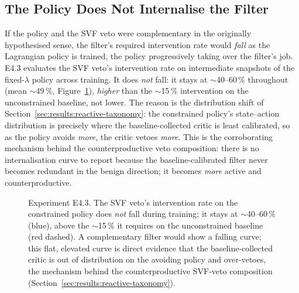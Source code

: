 \documentclass[11pt,a4paper]{report}
\begin{document}
\subsection{The Policy Does Not Internalise the Filter}
\label{sec:results:interaction}

If the policy and the SVF veto were complementary in the originally
hypothesised sense, the filter's required intervention rate would
\emph{fall} as the Lagrangian policy is trained, the policy
progressively taking over the filter's job. E4.3 evaluates the SVF
veto's intervention rate on intermediate snapshots of the
fixed-$\lambda$ policy across training. It does \emph{not} fall: it
stays at $\sim$40--60\,\% throughout (mean $\sim$49\,\%, Figure~\ref{fig:e4.3-internalisation}),
\emph{higher} than the $\sim$15\,\% intervention on the unconstrained
baseline, not lower. The reason is the distribution shift of
Section~\ref{sec:results:reactive-taxonomy}: the constrained policy's
state--action distribution is precisely where the baseline-collected
critic is least calibrated, so as the policy avoids \emph{more}, the
critic vetoes \emph{more}. This is the corroborating mechanism behind
the counterproductive veto composition: there is no internalisation
curve to report because the baseline-calibrated filter never becomes
redundant in the benign direction; it becomes \emph{more} active and
counterproductive.

\begin{figure}[htbp]
\centering
{}
\caption{Experiment E4.3. The SVF veto's intervention rate on the
constrained policy does \emph{not} fall during training; it stays at
$\sim$40--60\,\% (blue), above the $\sim$15\,\% it requires on the
unconstrained baseline (red dashed). A complementary filter would show
a falling curve; this flat, elevated curve is direct evidence that the
baseline-collected critic is out of distribution on the avoiding
policy and over-vetoes, the mechanism behind the counterproductive
SVF-veto composition
(Section~\ref{sec:results:reactive-taxonomy}).}
\label{fig:e4.3-internalisation}
\end{figure}
\end{document}
